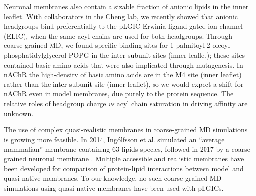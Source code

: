 \documentclass[%
 aip,
 amsmath,amssymb,
 preprint,%
]{revtex4-1}\usepackage{setspace}
\newcommand{\liam}[1]{\textcolor{black}{#1}}
\newcommand{\grace}[1]{\textcolor{black}{{#1}}}
\newcommand{\nachr}{nAChR}
\newcommand{\plgic}{pLGIC}
\begin{document}
Neuronal membranes also contain a sizable fraction of anionic lipids in the inner leaflet\cite{Isolated1969,Breckenridge1973,Taguchi2010}. With collaborators in the Cheng lab, we recently\cite{Tong2019} showed that anionic headgroups bind preferentially to the \plgic{} Erwinia ligand-gated ion channel (ELIC), when the same acyl chains are used for both headgroups.  Through coarse-grained MD, we found specific binding sites for 1-palmitoyl-2-oleoyl phosphatidylglycerol POPG in the \liam{inter-subunit} sites (inner leaflet); these sites contained basic amino acids that were also implicated through mutagenesis\cite{Tong2019}.  In \nachr{} the high-density of basic amino acids are in the M4 site (inner leaflet) rather than the \liam{inter-subunit} site (inner leaflet), so we would expect a shift for \nachr{} even in model membranes, due purely to the protein sequence. %
The relative roles of headgroup charge {\it vs} acyl chain saturation in driving affinity are unknown. %

The use of complex quasi-realistic membranes in coarse-grained MD simulations is growing more feasible. In 2014, Ing{\'o}lfsson \liam{et al.} \cite{Ingolfsson2014} simulated an ``average mammalian'' membrane containing 63 lipids species, followed in 2017 by a coarse-grained neuronal membrane \cite{Ingolfsson2017b}. Multiple accessible and realistic membranes have been developed for comparison of protein-lipid interactions between model and quasi-native membranes\cite{Marrink2019,Wilson2020,Ingolfsson2020,Carpenter2018,Lorent2019}. To our knowledge, no such coarse-grained MD simulations using quasi-native membranes have been used with \plgic s.
\end{document}

